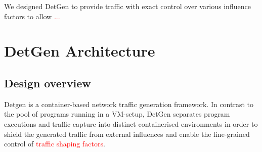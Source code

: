\documentclass[runningheads]{llncs}
\begin{document}
We designed DetGen to provide traffic with exact control over various influence factors to allow \textcolor{red}{...}





\section{DetGen Architecture}



\subsection{Design overview}


Detgen is a container-based network traffic generation framework.%
In contrast to the pool of programs running in a VM-setup, DetGen separates program executions and traffic capture into distinct containerised environments in order to shield the generated traffic from external influences and enable the fine-grained control of \textcolor{red}{traffic shaping factors}.
\end{document}
